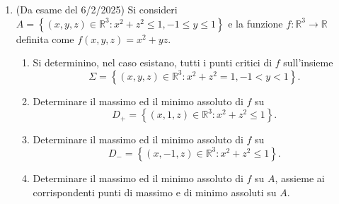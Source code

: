 \begin{enumerate}
		Studiamo ora la funzione $f$ sulla circonferenza $C = \left\{(x,y,0) \in \mathbb{R}^3 : x^2 + y^2 = 1\right\}$. Il massimo ed il minimo assoluti di $f$ su $C$ esistono in quanto è continua e $C$ è compatto. Si possono determinare studiando quindi $F(x,y) = x^2 e^{y^2}$ su $E = \left\{(x,y) \in \mathbb{R}^2 : x^2 + y^2 = 1\right\}$. Abbiamo un nuovo sistema
		\[
		\begin{cases}
			2x e^{y^2} = \lambda x \\
			2y x^2 e^{y^2} = \lambda y \\
			x^2 + y^2 = 1
		\end{cases}
		\]
		
		Se $\lambda = 0$ allora $x = 0$ e $y = \pm 1$, quindi abbiamo i due punti critici $(0,1)$ e $(0,-1)$. Per tali valori otteniamo $F(0,\pm 1) = 0 = \min_E F$. Se $\lambda \neq 0$ allora deve essere $x \neq 0$. Infatti se così non fosse allora $x = 0$ implicherebbe nella seconda equazione che $y = 0$, violando il vincolo della terza equazione. Se $y = 0$, allora $\lambda = 2$ dalla prima equazione, la seconda equazione è soddisfatta e otteniamo i punti critici $(\pm 1,0)$ a cui corrispondono i valori $F(\pm 1,0) = 1$. Rimane infine il caso in cui $y \neq 0$, che dalla prima e seconda equazione danno $2 e^{y^2} = \lambda = 2x^2 e^{y^2}$, pertanto $|x| = 1$ e dal vincolo si ottiene la contraddizione $y = 0$. Concludiamo che il massimo assoluto di $F$ su $E$ è $F(\pm 1,0) = 1 = \max_E F$, pertanto
		\[
		\max_C f = f(\pm 1,0,0) = 1 = \max_E F \quad \text{e} \quad \min_C f = f(0,\pm 1,0) = 0 = \min_E F.
		\]
		
		Riguardo alla terza domanda, il massimo assoluto di $f$ su $S$ esiste per la compattezza di $S$, ma non può essere nei punti di $\Sigma \setminus A$, in quanto tale insieme non ha punti critici. Quindi il punto di massimo deve essere in $C$ e ne segue che
		\[
		\max_S f = \max_C f = 1 \quad \text{e} \quad \min_S f = 0.
		\]
	
	\item (Da esame del 6/2/2025) Si consideri $A = \left\{(x,y,z) \in \mathbb{R}^3 : x^2 + z^2 \leq 1, -1 \leq y \leq 1\right\}$ e la funzione $f: \mathbb{R}^3 \to \mathbb{R}$ definita come $f(x,y,z) = x^2 + y z$.
	\begin{enumerate}
		\item Si determinino, nel caso esistano, tutti i punti critici di $f$ sull'insieme
		\[
		\Sigma = \left\{(x,y,z) \in \mathbb{R}^3 : x^2 + z^2 = 1, -1 < y < 1\right\}.
		\]
		\item Determinare il massimo ed il minimo assoluto di $f$ su
		\[
		D_+ = \left\{(x,1,z) \in \mathbb{R}^3 : x^2 + z^2 \leq 1\right\}.
		\]
		\item Determinare il massimo ed il minimo assoluto di $f$ su
		\[
		D_- = \left\{(x,-1,z) \in \mathbb{R}^3 : x^2 + z^2 \leq 1\right\}.
		\]
		\item Determinare il massimo ed il minimo assoluto di $f$ su $A$, assieme ai corrispondenti punti di massimo e di minimo assoluti su $A$.
	\end{enumerate}
	

\end{enumerate}
